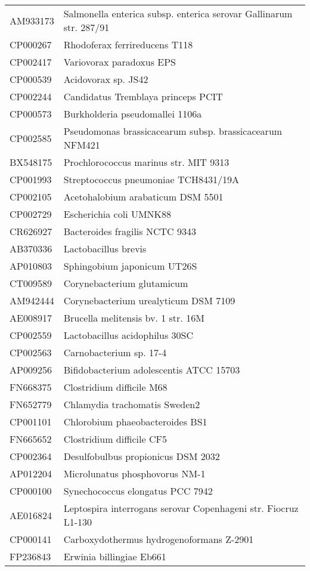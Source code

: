 \begin{longtable}{ll}
AM933173 & Salmonella enterica subsp. enterica serovar Gallinarum str. 287/91\\
CP000267 & Rhodoferax ferrireducens T118\\
CP002417 & Variovorax paradoxus EPS\\
CP000539 & Acidovorax sp. JS42\\
CP002244 & Candidatus Tremblaya princeps PCIT\\
CP000573 & Burkholderia pseudomallei 1106a\\
CP002585 & Pseudomonas brassicacearum subsp. brassicacearum NFM421\\
BX548175 & Prochlorococcus marinus str. MIT 9313\\
CP001993 & Streptococcus pneumoniae TCH8431/19A\\
CP002105 & Acetohalobium arabaticum DSM 5501\\
CP002729 & Escherichia coli UMNK88\\
CR626927 & Bacteroides fragilis NCTC 9343\\
AB370336 & Lactobacillus brevis\\
AP010803 & Sphingobium japonicum UT26S\\
CT009589 & Corynebacterium glutamicum\\
AM942444 & Corynebacterium urealyticum DSM 7109\\
AE008917 & Brucella melitensis bv. 1 str. 16M\\
CP002559 & Lactobacillus acidophilus 30SC\\
CP002563 & Carnobacterium sp. 17-4\\
AP009256 & Bifidobacterium adolescentis ATCC 15703\\
FN668375 & Clostridium difficile M68\\
FN652779 & Chlamydia trachomatis Sweden2\\
CP001101 & Chlorobium phaeobacteroides BS1\\
FN665652 & Clostridium difficile CF5\\
CP002364 & Desulfobulbus propionicus DSM 2032\\
AP012204 & Microlunatus phosphovorus NM-1\\
CP000100 & Synechococcus elongatus PCC 7942\\
AE016824 & Leptospira interrogans serovar Copenhageni str. Fiocruz L1-130\\
CP000141 & Carboxydothermus hydrogenoformans Z-2901\\
FP236843 & Erwinia billingiae Eb661\\

\end{longtable}
